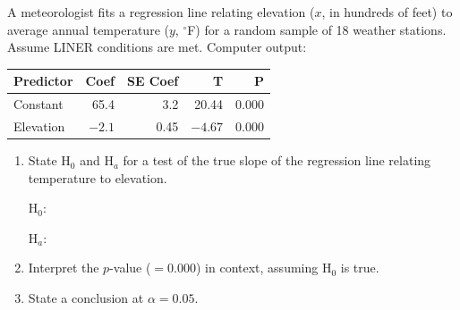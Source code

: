 \documentclass[10pt]{article}
\begin{document}
\namedateperiod

\vspace{0.1in}

A meteorologist fits a regression line relating elevation ($x$, in hundreds of feet)
to average annual temperature ($y$, ${}^\circ$F) for a random sample of 18 weather
stations. Assume LINER conditions are met. Computer output:

\begin{center}
\renewcommand{\arraystretch}{1.4}
\begin{tabular}{lrrrr}
    \textbf{Predictor} & \textbf{Coef} & \textbf{SE Coef} & \textbf{T} & \textbf{P} \\
    \hline
    Constant   & 65.4 & 3.2  & 20.44 & 0.000 \\
    Elevation  & $-2.1$ & 0.45 & $-4.67$ & 0.000 \\
\end{tabular}
\end{center}

\begin{enumerate}

  \item State H$_0$ and H$_a$ for a test of the true slope of the regression line
        relating temperature to elevation.

        H$_0$: \blank{9cm}

        \vspace{0.05in}

        H$_a$: \blank{9cm}

        \vspace{0.1in}

  \item Interpret the $p$-value ($= 0.000$) in context, assuming H$_0$ is true.

  \item State a conclusion at $\alpha = 0.05$.

\end{enumerate}
\end{document}
